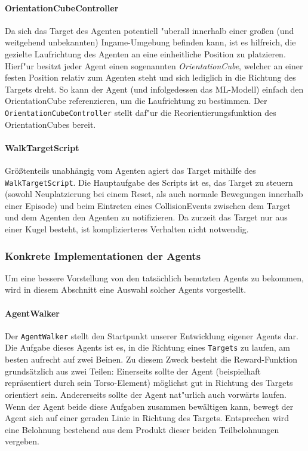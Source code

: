 \paragraph{OrientationCubeController}

Da sich das Target des Agenten potentiell "uberall innerhalb einer großen (und weitgehend unbekannten) Ingame-Umgebung befinden kann, ist es hilfreich, die gezielte Laufrichtung des Agenten an eine einheitliche Position zu platzieren. Hierf"ur besitzt jeder Agent einen sogenannten \textit{OrientationCube}, welcher an einer festen Position relativ zum Agenten steht und sich lediglich in die Richtung des Targets dreht. So kann der Agent (und infolgedessen das ML-Modell) einfach den OrientationCube referenzieren, um die Laufrichtung zu bestimmen. Der \texttt{OrientationCubeController} stellt daf"ur die Reorientierungsfunktion des OrientationCubes bereit.


\paragraph{WalkTargetScript}

Größtenteils unabhängig vom Agenten agiert das Target mithilfe des \texttt{WalkTargetScript}. Die Hauptaufgabe des Scripts ist es, das Target zu steuern (sowohl Neuplatzierung bei einem Reset, als auch normale Bewegungen innerhalb einer Episode) und beim Eintreten eines CollisionEvents zwischen dem Target und dem Agenten den Agenten zu notifizieren. Da zurzeit das Target nur aus einer Kugel besteht, ist komplizierteres Verhalten nicht notwendig.

\subsubsection{Konkrete Implementationen der Agents}
\label{sec:konkretAgents}

Um eine bessere Vorstellung von den tatsächlich benutzten Agents zu bekommen, wird in diesem Abschnitt eine Auswahl solcher Agents vorgestellt. 

\paragraph{AgentWalker}

Der \texttt{AgentWalker} stellt den Startpunkt unserer Entwicklung eigener Agents dar. Die Aufgabe dieses Agents ist es, in die Richtung eines \texttt{Targets} zu laufen, am besten aufrecht auf zwei Beinen. Zu diesem Zweck besteht die Reward-Funktion grundsätzlich aus zwei Teilen: Einerseits sollte der Agent (beispielhaft repräsentiert durch sein Torso-Element) möglichst gut in Richtung des Targets orientiert sein. Andererseits sollte der Agent nat"urlich auch vorwärts laufen. Wenn der Agent beide diese Aufgaben zusammen bewältigen kann, bewegt der Agent sich auf einer geraden Linie in Richtung des Targets. Entsprechen wird eine Belohnung bestehend aus dem Produkt dieser beiden Teilbelohnungen vergeben.

